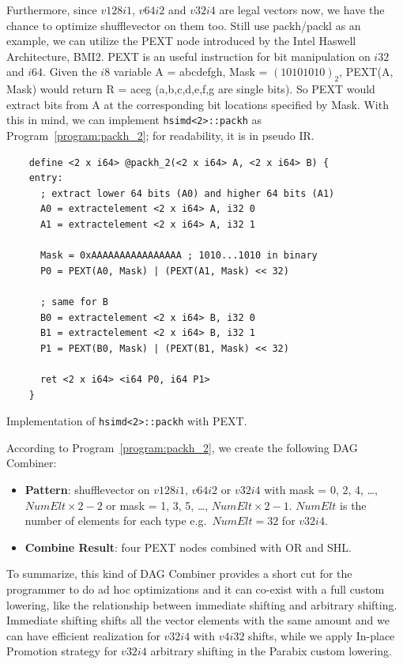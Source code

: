 Furthermore, since $v128i1$, $v64i2$ and $v32i4$ are legal vectors now, we have the chance to optimize shufflevector on them too. Still use packh/packl as an example, we can utilize the PEXT node introduced by the Intel Haswell Architecture, BMI2. PEXT is an useful instruction for bit manipulation on $i32$ and $i64$. Given the $i8$ variable A = abcdefgh, Mask = $(10101010)_2$, PEXT(A, Mask) would return R = aceg (a,b,c,d,e,f,g are single bits). So PEXT would extract bits from A at the corresponding bit locations specified by Mask. With this in mind, we can implement \verb|hsimd<2>::packh| as Program~\ref{program:packh_2}; for readability, it is in pseudo IR.

\begin{program}
\begin{verbatim}
    define <2 x i64> @packh_2(<2 x i64> A, <2 x i64> B) {
    entry:
      ; extract lower 64 bits (A0) and higher 64 bits (A1)
      A0 = extractelement <2 x i64> A, i32 0
      A1 = extractelement <2 x i64> A, i32 1

      Mask = 0xAAAAAAAAAAAAAAAA ; 1010...1010 in binary
      P0 = PEXT(A0, Mask) | (PEXT(A1, Mask) << 32)

      ; same for B
      B0 = extractelement <2 x i64> B, i32 0
      B1 = extractelement <2 x i64> B, i32 1
      P1 = PEXT(B0, Mask) | (PEXT(B1, Mask) << 32)

      ret <2 x i64> <i64 P0, i64 P1>
    }
\end{verbatim}
\caption{Implementation of {\tt hsimd<2>::packh} with PEXT.}
\label{program:packh_2}
\end{program}

According to Program~\ref{program:packh_2}, we create the following DAG Combiner:
\begin{itemize}
    \item \textbf{Pattern}: shufflevector on $v128i1$, $v64i2$ or $v32i4$ with mask = 0, 2, 4, \ldots, $NumElt \times 2-2$ or mask = 1, 3, 5, \ldots, $NumElt \times 2 -1$. $NumElt$ is the number of elements for each type e.g.\ $NumElt=32$ for $v32i4$.
    \item \textbf{Combine Result}: four PEXT nodes combined with OR and SHL.
\end{itemize}

To summarize, this kind of DAG Combiner provides a short cut for the programmer to do ad hoc optimizations and it can co-exist with a full custom lowering, like the relationship between immediate shifting and arbitrary shifting. Immediate shifting shifts all the vector elements with the same amount and we can have efficient realization for $v32i4$ with $v4i32$ shifts, while we apply In-place Promotion strategy for $v32i4$ arbitrary shifting in the Parabix custom lowering.

